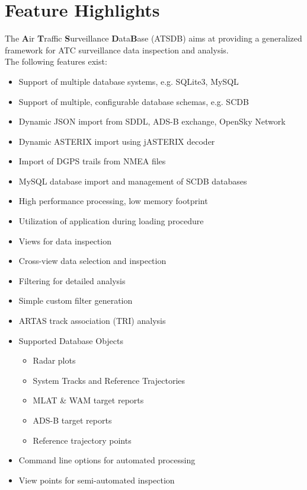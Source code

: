 \section{Feature Highlights}

The \textbf{A}ir \textbf{T}raffic \textbf{S}urveillance \textbf{D}ata\textbf{B}ase (ATSDB) aims at providing a generalized framework for ATC surveillance data inspection and analysis. \\

The following features exist: \\

\begin{itemize}  
\item Support of multiple database systems, e.g. SQLite3, MySQL
\item Support of multiple, configurable database schemas, e.g. SCDB
\item Dynamic JSON import from SDDL, ADS-B exchange, OpenSky Network
\item Dynamic ASTERIX import using jASTERIX decoder
\item Import of DGPS trails from NMEA files
\item MySQL database import and management of SCDB databases
\item High performance processing, low memory footprint
\item Utilization of application during loading procedure
\item Views for data inspection
\item Cross-view data selection and inspection
\item Filtering for detailed analysis
\item Simple custom filter generation
\item ARTAS track association (TRI) analysis
\item Supported Database Objects
\begin{itemize}  
\item Radar plots
\item System Tracks and Reference Trajectories
\item MLAT \& WAM target reports
\item ADS-B target reports
\item Reference trajectory points
\end{itemize}
\item Command line options for automated processing
\item View points for semi-automated inspection
\end{itemize} 
